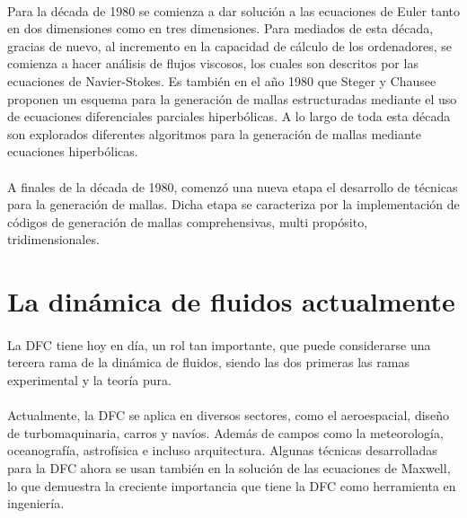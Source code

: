 \documentclass[letterpaper, openright, 12pt]{book}
\begin{document}
    \paragraph*{}
    Para la década de 1980 se comienza a dar solución a las ecuaciones de Euler
    tanto en dos dimensiones como en tres dimensiones. Para mediados de esta
    década, gracias de nuevo, al incremento en la capacidad de cálculo de los
    ordenadores, se comienza a hacer análisis de flujos viscosos, los cuales
    son descritos por las ecuaciones de Navier-Stokes.\cite{blazek} Es también
    en el año 1980 que Steger y Chausee proponen un esquema para la generación
    de mallas estructuradas mediante el uso de ecuaciones diferenciales
    parciales hiperbólicas. A lo largo de toda esta década son explorados
    diferentes algoritmos para la generación de mallas mediante ecuaciones
    hiperbólicas.

    \paragraph*{}
    A finales de la década de 1980, comenzó una nueva etapa el desarrollo de
    técnicas para la generación de mallas. Dicha etapa se caracteriza por la
    implementación de códigos de generación de mallas comprehensivas, multi
    propósito, tridimensionales.\cite{liseikin1999grid}

    \section{La dinámica de fluidos actualmente}
    \paragraph*{}
    La DFC tiene hoy en día, un rol tan importante, que puede considerarse una
    tercera rama de la dinámica de fluidos, siendo las dos primeras las ramas
    experimental y la teoría pura.\cite{anderson-yotros}

    \paragraph*{}
    Actualmente, la DFC se aplica en diversos sectores, como el aeroespacial,
    diseño de turbomaquinaria, carros y navíos. Además de campos como la
    meteorología, oceanografía, astrofísica e incluso arquitectura. Algunas
    técnicas desarrolladas para la DFC ahora se usan también en la solución de
    las ecuaciones de Maxwell, lo que demuestra la creciente importancia
    que tiene la DFC como herramienta en ingeniería.\cite{blazek}
\end{document}

